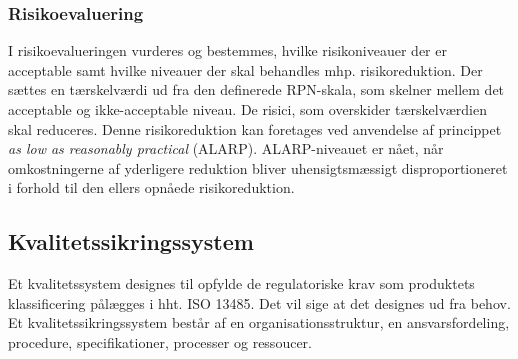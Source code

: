 	\subsubsection{Risikoevaluering}  
	I risikoevalueringen vurderes og bestemmes, hvilke risikoniveauer der er acceptable samt hvilke niveauer der skal behandles mhp. risikoreduktion. Der sættes en tærskelværdi ud fra den definerede RPN-skala, som skelner mellem det acceptable og ikke-acceptable niveau. De risici, som overskider tærskelværdien skal reduceres. Denne risikoreduktion kan foretages ved anvendelse af princippet \textit{as low as reasonably practical}{} (ALARP). ALARP-niveauet er nået, når omkostningerne af yderligere reduktion bliver uhensigtsmæssigt disproportioneret i forhold til den ellers opnåede risikoreduktion.    

\subsection{Kvalitetssikringssystem}

Et kvalitetssystem designes til opfylde de regulatoriske krav som produktets klassificering pålægges i hht. ISO 13485. Det vil sige at det designes ud fra behov. 
Et kvalitetssikringssystem består af en organisationsstruktur, en ansvarsfordeling, procedure, specifikationer, processer og ressoucer. 




